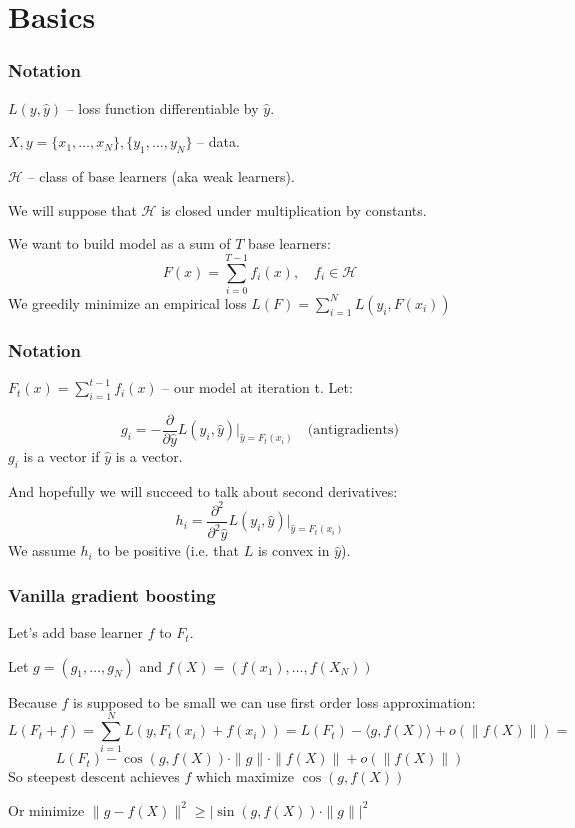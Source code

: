 \documentclass{beamer}
\begin{document}
\section{Basics}


\begin{frame}
\frametitle{Notation}
$L(y, \hat y)$ -- loss function differentiable by $\hat y$. \par
$X, y = \{x_1, \ldots ,x_N\}, \{y_1, \ldots ,y_N \}$ -- data. \par
$\mathcal{H}$ -- class of base learners (aka weak learners). \par
We will suppose that $\mathcal{H}$ is closed under multiplication by constants. \par
We want to build model as a sum of $T$ base learners:
$$F(x) = \sum_{i = 0}^{T - 1} f_i(x), \quad f_i \in \mathcal{H}$$
We greedily minimize an empirical loss $L(F) = \sum_{i=1}^N L(y_i, F(x_i))$

\end{frame}

\begin{frame}
\frametitle{Notation}
$F_t(x) = \sum_{i = 1}^{t-1} f_i(x)$ -- our model at iteration t. Let:\par
$$g_i = -\frac{\partial}{\partial \hat y} L(y_i, \hat y)|_{\hat y = F_t(x_i)} \quad \mbox{(antigradients)}$$
$g_i$ is a vector if $\hat y$ is a vector.\par
And hopefully we will succeed to talk about second derivatives:
$$h_i = \frac{\partial^2}{\partial^2 \hat y} L(y_i, \hat y)|_{\hat y = F_t(x_i)}$$
We assume $h_i$ to be positive (i.e. that $L$ is convex in $\hat y$).

\end{frame}

\begin{frame}
\frametitle{Vanilla gradient boosting}
Let's add base learner $f$ to $F_t$.\par
Let $g = (g_1, \ldots, g_N)$ and $f(X) = (f(x_1), \ldots, f(X_N))$ \par
Because $f$ is supposed to be small we can use first order loss approximation:
$$ L(F_t + f) = \sum_{i=1}^N L(y, F_t(x_i) + f(x_i)) = L(F_t) -\langle g, f(X)\rangle + o(\|f(X)\|) = $$
$$ L(F_t) - \cos(g, f(X)) \cdot \|g\| \cdot \|f(X)\| + o(\|f(X)\|)$$
So steepest descent achieves $f$ which maximize $\cos(g, f(X))$ \par
Or minimize $\|g - f(X) \|^2 \geqslant |\sin(g, f(X)) \cdot \|g\||^2$

\end{frame}
\end{document}

